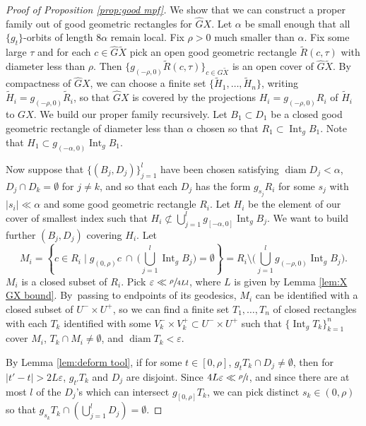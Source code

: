 \documentclass[11pt]{article}
\let\epsilon\varepsilon
\let\sep\mid
\theoremstyle{definition}
\numberwithin{equation}{section}
\DeclareMathOperator{\diam}{diam}
\DeclareMathOperator{\Int}{Int}
\begin{document}
\begin{proof}[Proof of Proposition \ref{prop:good mpf}]
We show that we can construct a proper family out of good geometric rectangles for $\hat G X$.
Let $\alpha$ be small enough that all $\{g_t\}$-orbits of length $8\alpha$ remain local. Fix $\rho>0$ much smaller than $\alpha$. Fix some large $\tau$ and for each $c \in \hat G\tilde X$ pick an open good geometric rectangle $\tilde R(c,\tau)$ with diameter less than $\rho$. Then $\{ g_{(-\rho,0)} \tilde R(c, \tau)\}_{c\in G\tilde X}$ is an open cover of $\hat G\tilde X$. By compactness of $\hat GX$, we can choose a finite set $\{ \tilde H_1, \ldots, \tilde H_n\}$, writing $\tilde H_i = g_{(-\rho,0)}\tilde R_i$, so that $\hat GX$ is covered by the projections $H_i= g_{(-\rho,0)} R_i$ of $\tilde H_i$ to $GX$. We build our proper family recursively. Let $B_1 \subset D_1$ be a closed good geometric rectangle of diameter less than $\alpha$ chosen so that $R_1 \subset \Int_g B_1$. Note that $H_1 \subset g_{(-\alpha,0)} \Int_g B_1$.

Now suppose that $\{ (B_j, D_j) \}_{j=1}^l$ have been chosen satisfying $\diam D_j < \alpha$, \hbox{$D_j \cap D_k = \emptyset$} for $j\neq k$, and so that each $D_j$ has the form $g_{s_j}R_i$ for some $s_j$ with $|s_i| \ll  \alpha$ and some good geometric rectangle $R_i$. Let $H_i$ be the element of our cover of smallest index such that $H_i \not\subset \bigcup_{j=1}^l g_{[-\alpha,0]} \Int_g B_j$.
We want to build further $(B_j, D_j)$ covering $H_i$. Let\vspace*{-3pt}\enlargethispage{\baselineskip}%
\[\textstyle
M_i = \left\{ c\in R_i \sep g_{(0,\rho)} c \ \cap \ \big(\bigcup_{j=1}^l \Int_g B_j\big) = \emptyset \right\}
= R_i \setminus \bigl( \bigcup_{j=1}^l g_{(-\rho,0)} \Int_g B_j \bigr).
\]
$M_i$ is a closed subset of $R_i$. Pick $\epsilon \ll  \sfrac{\rho}{4Ll}$, where $L$ is given by Lemma \ref{lem:X GX bound}. By~passing to endpoints of its geodesics, $M_i$ can be identified with a closed subset of $U^-\times U^+$, so we can find a finite set $T_1, \ldots, T_n$ of closed rectangles with each $T_k$ identified with some $V_k^-\times V_k^+ \subset U^-\times U^+$ such that $\{ \Int_g T_k\}_{k=1}^n$ cover $M_i$, $T_k \cap M_i \neq \emptyset$, and $\diam T_k < \epsilon$.

By Lemma \ref{lem:deform tool}, if for some $t\in [0,\rho]$, $g_tT_k \cap D_j \neq \emptyset$, then for $|t'-t|>2L\epsilon$, $g_{t'}T_k$ and $D_j$ are disjoint. Since $4L\epsilon \ll  \sfrac{\rho}{l}$, and since there are at most $l$ of the $D_j$'s which can intersect $g_{[0,\rho]}T_k$, we can pick distinct $s_k \in (0, \rho)$ so that $g_{s_k} T_k \cap ( \bigcup _{j=1}^l D_j ) = \emptyset$.


\end{proof}
\end{document}

